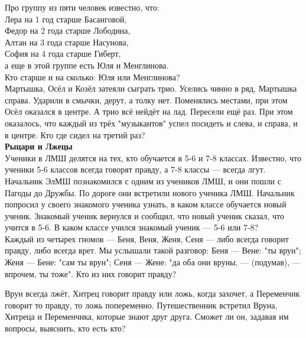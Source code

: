  Про группу из пяти человек известно, что:\\
Лера на 1 год старше Басанговой,\\
Федор на 2 года старше Лободина,\\
Алтан на 3 года старше Насунова,\\
София на 4 года старше Гиберт,\\
а еще в этой группе есть Юля и Менглинова.\\
Кто старше и на сколько: Юля или Менглинова?\\

Мартышка, Осёл и Козёл затеяли сыграть трио. Уселись чинно в ряд, Мартышка справа. Ударили в смычки, дерут, а толку нет. Поменялись местами, при этом Осёл оказался в центре. А трио всё нейдёт на лад. Пересели ещё раз. При этом оказалось, что каждый из трёх "музыкантов" успел посидеть и слева, и справа, и в центре. Кто где сидел на третий раз?\\

\textbf{\Large Рыцари и Лжецы}\\

Ученики в ЛМШ делятся на тех, кто обучается в 5-6 и 7-8 классах. Известно, что ученики 5-6 классов всегда говорят правду, а 7-8 классы — всегда лгут. Начальник ЭлМШ познакомился с одним из учеников ЛМШ, и они пошли с Пагоды до Дружбы. По дороге они встретили нового ученика ЛМШ. Начальник попросил у своего знакомого ученика узнать, в каком классе обучается новый ученик. Знакомый ученик вернулся и сообщил, что новый ученик сказал, что учится в 5-6. В каком классе учился знакомый ученик — 5-6 или 7-8?\\

Каждый из четырех гномов — Беня, Веня, Женя, Сеня — либо всегда говорит правду, либо всегда врет. Мы услышали такой разговор: Беня — Вене: "ты врун"; Женя — Бене: "сам ты врун"; Сеня — Жене: "да оба они вруны, — (подумав), — впрочем, ты тоже". Кто из них говорит правду?\newpage

Врун всегда лжёт, Хитрец говорит правду или ложь, когда захочет, а Переменчик говорит то правду, то ложь попеременно. Путешественник встретил Вруна, Хитреца и Переменчика, которые знают друг друга. Сможет ли он, задавая им вопросы, выяснить, кто есть кто?\\